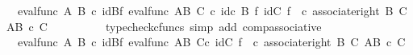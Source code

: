 \begin{isabellebody}
\ {\isachardoublequoteopen}{\isachardot}{\kern0pt}{\isachardot}{\kern0pt}{\isachardot}{\kern0pt}\ {\isacharequal}{\kern0pt}{\isacharparenleft}{\kern0pt}eval{\isacharunderscore}{\kern0pt}func\ A\ B{\isacharparenright}{\kern0pt}\ {\isasymcirc}\isactrlsub c\ {\isacharparenleft}{\kern0pt}{\isacharparenleft}{\kern0pt}id{\isacharparenleft}{\kern0pt}B{\isacharparenright}{\kern0pt}{\isasymtimes}\isactrlsub f\ eval{\isacharunderscore}{\kern0pt}func\ {\isacharparenleft}{\kern0pt}A\isactrlbsup B\isactrlesup {\isacharparenright}{\kern0pt}\ C{\isacharparenright}{\kern0pt}\ {\isasymcirc}\isactrlsub c\ {\isacharparenleft}{\kern0pt}id\isactrlsub c\ {\isacharparenleft}{\kern0pt}B{\isacharparenright}{\kern0pt}\ {\isasymtimes}\isactrlsub f\ {\isacharparenleft}{\kern0pt}id{\isacharparenleft}{\kern0pt}C{\isacharparenright}{\kern0pt}\ {\isasymtimes}\isactrlsub f\ {\isasymphi}\isactrlsup {\isasymsharp}\isactrlsup {\isasymsharp}{\isacharparenright}{\kern0pt}{\isacharparenright}{\kern0pt}{\isacharparenright}{\kern0pt}\ {\isasymcirc}\isactrlsub c\ {\isacharparenleft}{\kern0pt}associate{\isacharunderscore}{\kern0pt}right\ B\ C\ {\isacharparenleft}{\kern0pt}A\isactrlbsup {\isacharparenleft}{\kern0pt}B\ {\isasymtimes}\isactrlsub c\ C{\isacharparenright}{\kern0pt}\isactrlesup {\isacharparenright}{\kern0pt}{\isacharparenright}{\kern0pt}{\isachardoublequoteclose}\isanewline
\ \ \ \ \ \ \ \ \isamarkupfalse%
\ {\isacharparenleft}{\kern0pt}typecheck{\isacharunderscore}{\kern0pt}cfuncs{\isacharcomma}{\kern0pt}\ simp\ add{\isacharcolon}{\kern0pt}\ comp{\isacharunderscore}{\kern0pt}associative{}{\isacharparenright}{\kern0pt}\isanewline
\ \ \ \ \ \ \isamarkupfalse%
\ \isamarkupfalse%
\ {\isachardoublequoteopen}{\isachardot}{\kern0pt}{\isachardot}{\kern0pt}{\isachardot}{\kern0pt}\ {\isacharequal}{\kern0pt}{\isacharparenleft}{\kern0pt}eval{\isacharunderscore}{\kern0pt}func\ A\ B{\isacharparenright}{\kern0pt}\ {\isasymcirc}\isactrlsub c\ {\isacharparenleft}{\kern0pt}id{\isacharparenleft}{\kern0pt}B{\isacharparenright}{\kern0pt}{\isasymtimes}\isactrlsub f\ {\isacharparenleft}{\kern0pt}{\isacharparenleft}{\kern0pt}eval{\isacharunderscore}{\kern0pt}func\ {\isacharparenleft}{\kern0pt}A\isactrlbsup B\isactrlesup {\isacharparenright}{\kern0pt}\ C{\isacharparenright}{\kern0pt}{\isasymcirc}\isactrlsub c\ {\isacharparenleft}{\kern0pt}id{\isacharparenleft}{\kern0pt}C{\isacharparenright}{\kern0pt}\ {\isasymtimes}\isactrlsub f\ {\isasymphi}\isactrlsup {\isasymsharp}\isactrlsup {\isasymsharp}{\isacharparenright}{\kern0pt}{\isacharparenright}{\kern0pt}{\isacharparenright}{\kern0pt}\ {\isasymcirc}\isactrlsub c\ {\isacharparenleft}{\kern0pt}associate{\isacharunderscore}{\kern0pt}right\ B\ C\ {\isacharparenleft}{\kern0pt}A\isactrlbsup {\isacharparenleft}{\kern0pt}B\ {\isasymtimes}\isactrlsub c\ C{\isacharparenright}{\kern0pt}\isactrlesup {\isacharparenright}{\kern0pt}{\isacharparenright}{\kern0pt}{\isachardoublequoteclose}\isanewline

\end{isabellebody}

